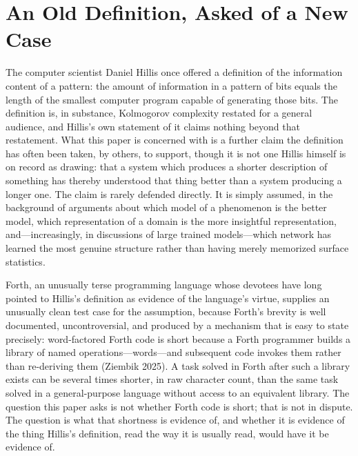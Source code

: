 \documentclass[11pt]{article}
\theoremstyle{plain}
\begin{document}
\newpage
\tableofcontents
\bigskip

\section{An Old Definition, Asked of a New Case}

The computer scientist Daniel Hillis once offered a definition of the information content of a pattern: the amount of information in a pattern of bits equals the length of the smallest computer program capable of generating those bits. The definition is, in substance, Kolmogorov complexity restated for a general audience, and Hillis's own statement of it claims nothing beyond that restatement. What this paper is concerned with is a further claim the definition has often been taken, by others, to support, though it is not one Hillis himself is on record as drawing: that a system which produces a shorter description of something has thereby understood that thing better than a system producing a longer one. The claim is rarely defended directly. It is simply assumed, in the background of arguments about which model of a phenomenon is the better model, which representation of a domain is the more insightful representation, and---increasingly, in discussions of large trained models---which network has learned the most genuine structure rather than having merely memorized surface statistics.

Forth, an unusually terse programming language whose devotees have long pointed to Hillis's definition as evidence of the language's virtue, supplies an unusually clean test case for the assumption, because Forth's brevity is well documented, uncontroversial, and produced by a mechanism that is easy to state precisely: word-factored Forth code is short because a Forth programmer builds a library of named operations---words---and subsequent code invokes them rather than re-deriving them (Ziembik 2025). A task solved in Forth after such a library exists can be several times shorter, in raw character count, than the same task solved in a general-purpose language without access to an equivalent library. The question this paper asks is not whether Forth code is short; that is not in dispute. The question is what that shortness is evidence of, and whether it is evidence of the thing Hillis's definition, read the way it is usually read, would have it be evidence of.
\end{document}
